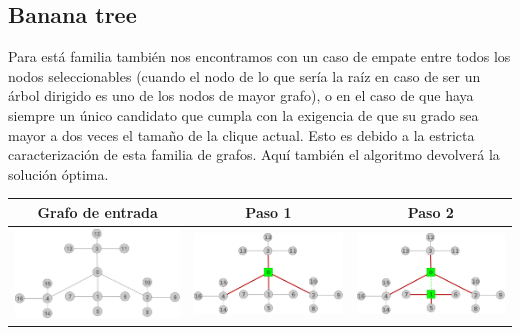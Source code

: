 \subsection{Banana tree}
	Para est\'a familia tambi\'en nos encontramos con un caso de empate entre todos los 
	nodos seleccionables (cuando el nodo de lo que ser\'ia la ra\'iz en caso de ser
	un \'arbol dirigido es uno de los nodos de mayor grafo), o en el caso de que
	haya siempre un \'unico candidato que cumpla con la exigencia de que su grado sea
	mayor a dos veces el tama\~no de la clique actual. Esto es debido a la estricta 
	caracterizaci\'on de esta familia de grafos. Aqu\'i tambi\'en el algoritmo 
	devolver\'a la soluci\'on \'optima.
	\begin{center}
		\begin{tabular}{ |c||c|c| }
			\hline
			Grafo de entrada & Paso 1 & Paso 2 \\
			\hline\hline
			\includegraphics[scale = 0.2]{img/ej3/constructiva_golosa/banana4,4_st0.png} &
			\includegraphics[scale = 0.2]{img/ej3/constructiva_golosa/banana4,4_st1.png} & 
			\includegraphics[scale = 0.2]{img/ej3/constructiva_golosa/banana4,4_st2.png} \\

\end{tabular}
\end{center}
